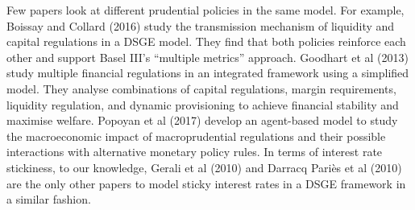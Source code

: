 \documentclass[12pt]{article}
\numberwithin{equation}{section}
\begin{document}
Few papers look at different prudential policies in the same model. For example, Boissay and Collard (2016) study the transmission mechanism of liquidity and capital regulations in a DSGE model. They find that both policies reinforce each other and support Basel III’s “multiple metrics” approach. Goodhart et al (2013) study multiple financial regulations in an integrated framework using a simplified model. They analyse combinations of capital regulations, margin requirements, liquidity regulation, and dynamic provisioning to achieve financial stability and maximise welfare. Popoyan et al (2017) develop an agent-based model to study the macroeconomic impact of macroprudential regulations and their possible interactions with alternative monetary policy rules.
In terms of interest rate stickiness, to our knowledge, Gerali et al (2010) and Darracq Pariès et al (2010) are the only other papers to model sticky interest rates in a DSGE framework in a similar fashion.
\end{document}
